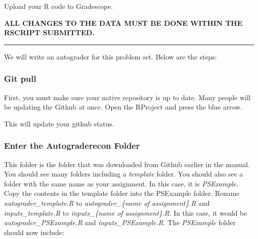 \documentclass[
]{article}
\begin{document}
Upload your R code to Gradescope.

\textbf{ALL CHANGES TO THE DATA MUST BE DONE WITHIN THE RSCRIPT
SUBMITTED.}

\begin{center}\rule{0.5\linewidth}{0.5pt}\end{center}

We will write an autograder for this problem set. Below are the steps:

\hypertarget{git-pull}{%
\subsubsection{Git pull}\label{git-pull}}

First, you must make sure your native repository is up to date. Many
people will be updating the Github at once. Open the RProject and press
the blue arrow.

This will update your github status.

\hypertarget{enter-the-autograderecon-folder}{%
\subsubsection{Enter the Autograderecon
Folder}\label{enter-the-autograderecon-folder}}

This folder is the folder that was downloaded from Github earlier in the
manual. You should see many folders including a \emph{template} folder.
You should also see a folder with the same name as your assignment. In
this case, it is \emph{PSExample}. Copy the contents in the template
folder into the PSExample folder. Rename \emph{autograder\_template.R}
to \emph{autograder\_\{name of assignment\}.R} and
\emph{inputs\_template.R} to \emph{inputs\_\{name of assignment\}.R}. In
this case, it would be \emph{autograder\_PSExample.R} and
\emph{inputs\_PSExample.R}. The \emph{PSExample} folder should now
include:

\begin{center}
\end{center}
\end{document}
